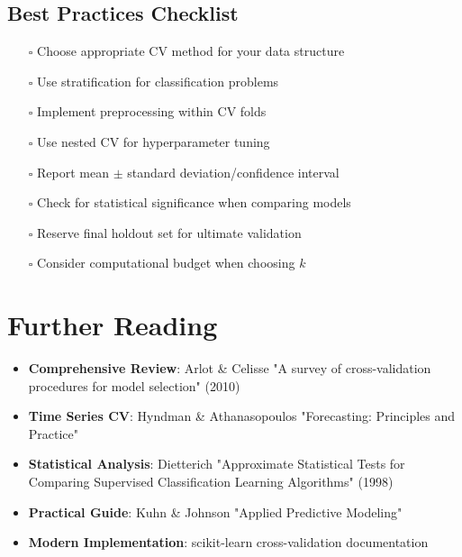 \documentclass{article}
\begin{document}
\subsection{Best Practices Checklist}

\begin{itemize}
    \item[$\square$] Choose appropriate CV method for your data structure
    \item[$\square$] Use stratification for classification problems
    \item[$\square$] Implement preprocessing within CV folds
    \item[$\square$] Use nested CV for hyperparameter tuning
    \item[$\square$] Report mean $\pm$ standard deviation/confidence interval
    \item[$\square$] Check for statistical significance when comparing models
    \item[$\square$] Reserve final holdout set for ultimate validation
    \item[$\square$] Consider computational budget when choosing $k$
\end{itemize}

\section{Further Reading}

\begin{itemize}
    \item \textbf{Comprehensive Review}: Arlot \& Celisse "A survey of cross-validation procedures for model selection" (2010)
    \item \textbf{Time Series CV}: Hyndman \& Athanasopoulos "Forecasting: Principles and Practice"
    \item \textbf{Statistical Analysis}: Dietterich "Approximate Statistical Tests for Comparing Supervised Classification Learning Algorithms" (1998)
    \item \textbf{Practical Guide}: Kuhn \& Johnson "Applied Predictive Modeling"
    \item \textbf{Modern Implementation}: scikit-learn cross-validation documentation
\end{itemize}
\end{document}
